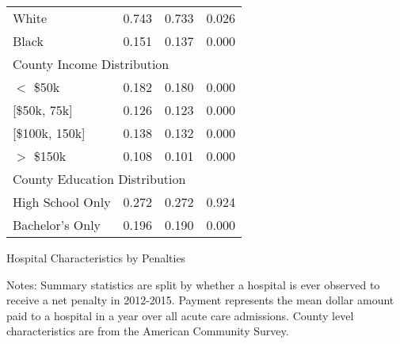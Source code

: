 \documentclass[12pt]{article}
\begin{document}
{\begin{tabular}{lccc}
\hspace{0.05in}White     &     0.743   &     0.733    &    0.026\\
\hspace{0.05in}Black    &     0.151  &      0.137   &     0.000\\
\multicolumn{4}{l}{County Income Distribution}\\
\hspace{0.05in}$<$ \$50k   &    0.182   &     0.180      &  0.000\\
\hspace{0.05in}[\$50k, 75k]   &   0.126   &     0.123    &    0.000\\
\hspace{0.05in}[\$100k, 150k]       & 0.138     &   0.132  &      0.000\\
\hspace{0.05in}$>$ \$150k   &    0.108    &    0.101 &       0.000\\
\multicolumn{4}{l}{County Education Distribution}\\
\hspace{0.05in}High School Only   &     0.272   &     0.272   &     0.924\\
\hspace{0.05in}Bachelor's Only      &     0.196    &    0.190   &     0.000\\
\hline
\end{tabular}
}
\setlength{\captionmargin}{.5 \textwidth} \addtolength{\captionmargin}{-.5\wd\gfxbox}
\begin{table}[!h]
\centering
\caption{Hospital Characteristics by Penalties}
\label{tab:bypenalty}
\usebox{\gfxbox}
\par
\begin{minipage}{\wd\gfxbox}
\footnotesize
Notes: Summary statistics are split by whether a hospital is ever observed to receive a net penalty in 2012-2015. Payment represents the mean dollar amount paid to a hospital in a year over all acute care admissions.   County level characteristics are from the American Community Survey.
\end{minipage}
\end{table}
\end{document}
